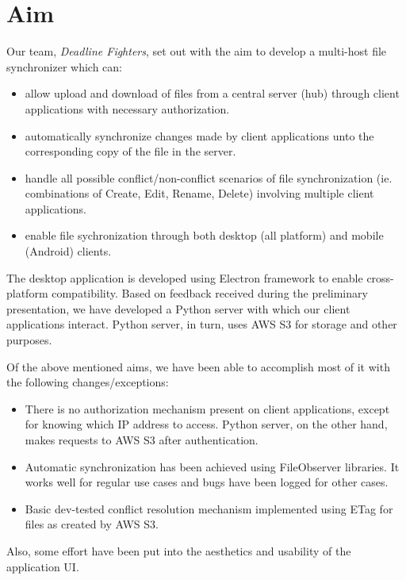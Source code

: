 \section{Aim}
Our team, \emph{Deadline Fighters}, set out with the aim to develop a multi-host file synchronizer which can:
\begin{itemize}
\item{allow upload and download of files from a central server (hub) through client applications with necessary authorization.}
\item{automatically synchronize changes made by client applications unto the corresponding copy of the file in the server.}
\item{handle all possible conflict/non-conflict scenarios of file synchronization (ie. combinations of Create, Edit, Rename, Delete) involving multiple client applications.}
\item{enable file sychronization through both desktop (all platform) and mobile (Android) clients.}
\end{itemize}

The desktop application is developed using Electron framework to enable cross-platform compatibility. Based on feedback received during the preliminary presentation, we have developed a Python server with which our client applications interact. Python server, in turn, uses AWS S3 for storage and other purposes.

Of the above mentioned aims, we have been able to accomplish most of it with the following changes/exceptions:

\begin{itemize}
	\item{There is no authorization mechanism present on client applications, except for knowing which IP address to access. Python server, on the other hand, makes requests to AWS S3 after authentication.}
	\item{Automatic synchronization has been achieved using FileObserver libraries. It works well for regular use cases and bugs have been logged for other cases.}
	\item{Basic dev-tested conflict resolution mechanism implemented using ETag for files as created by AWS S3.}
\end{itemize}

Also, some effort have been put into the aesthetics and usability of the application UI.\newline
